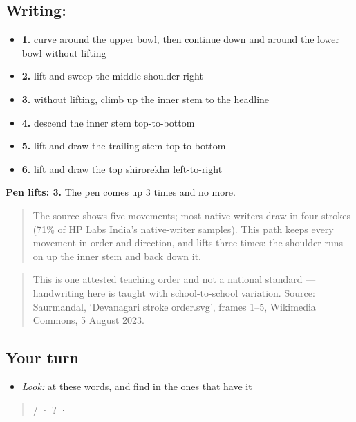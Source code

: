 \subsection*{Writing: }

\begin{itemize}
\raggedright
  \item \textbf{1.} curve around the upper bowl, then continue down and around the lower bowl without lifting
  \item \textbf{2.} lift and sweep the middle shoulder right
  \item \textbf{3.} without lifting, climb up the inner stem to the headline
  \item \textbf{4.} descend the inner stem top-to-bottom
  \item \textbf{5.} lift and draw the trailing stem top-to-bottom
  \item \textbf{6.} lift and draw the top shirorekhā left-to-right
\end{itemize}

\textbf{Pen lifts: 3.} The pen comes up 3 times and no more.

\begin{quote}
The source shows five movements; most native writers draw  in four strokes (71\% of HP Labs India's native-writer samples). This path keeps every movement in order and direction, and lifts three times: the shoulder runs on up the inner stem and back down it.
\end{quote}

\begin{quote}
This is one attested teaching order and not a national standard — handwriting here is taught with school-to-school variation. Source: Saurmandal, ‘Devanagari  stroke order.svg’, frames 1–5, Wikimedia Commons, 5 August 2023.
\end{quote}

\subsection*{Your turn}
\begin{itemize}
\raggedright
  \item \emph{Look:} at these words, and find  in the ones that have it
\end{itemize}

\begin{quote}
 /   ·     ?  ·  
\end{quote}

